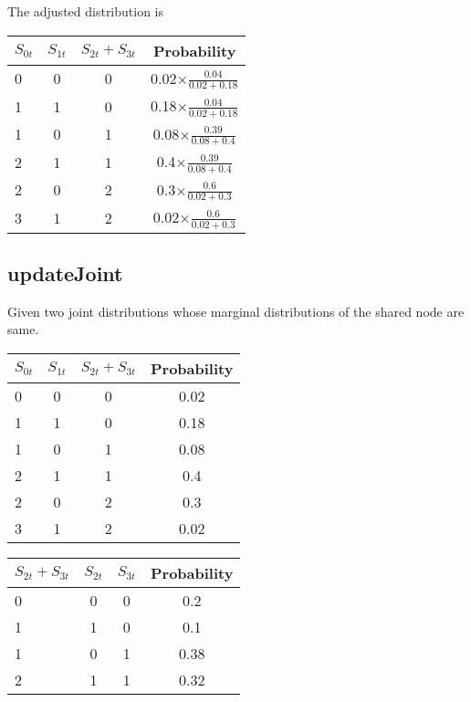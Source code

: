 \documentclass[12pt]{article}
\begin{document}
\noindent The adjusted distribution is

\begin{table}[h]
    \begin{tabular}{lccc}
        \hline
        $S_{0t}$ & $S_{1t}$ & $S_{2t}+S_{3t}$ & Probability\\\hline
        0 & 0 & 0 &  0.02$\times\frac{0.04}{0.02+0.18}$\\
        1 & 1 & 0 &  0.18$\times\frac{0.04}{0.02+0.18}$ \\
        1 & 0 & 1 &  0.08$\times\frac{0.39}{0.08+0.4}$ \\
        2 & 1 & 1 &  0.4$\times\frac{0.39}{0.08+0.4}$\\
        2 & 0 & 2 &  0.3$\times\frac{0.6}{0.02+0.3}$\\
        3 & 1 & 2 &  0.02$\times\frac{0.6}{0.02+0.3}$\\\hline
    \end{tabular}
\end{table}


\subsection{updateJoint}
\label{updateJoint}

Given two joint distributions whose marginal distributions of the shared node are same.

\vspace{4mm}

\begin{minipage}[t]{0.4\textwidth}
    \begin{tabular}{lccc}
        \hline
        $S_{0t}$ & $S_{1t}$ & $S_{2t}+S_{3t}$ & Probability\\\hline
        0 & 0 & 0 &  0.02\\
        1 & 1 & 0 &  0.18 \\
        1 & 0 & 1 &  0.08 \\
        2 & 1 & 1 &  0.4\\
        2 & 0 & 2 &  0.3\\
        3 & 1 & 2 &  0.02\\\hline
    \end{tabular}
\end{minipage}%
\begin{minipage}[t]{.4\textwidth}
    \begin{tabular}{lccc}
        \hline
        $S_{2t}+S_{3t}$ & $S_{2t}$ & $S_{3t}$ &  Probability\\\hline
        0 & 0 & 0 &  0.2\\
        1 & 1 & 0 &  0.1 \\
        1 & 0 & 1 &  0.38 \\
        2 & 1 & 1 &  0.32\\\hline
    \end{tabular}
\end{minipage}%
\end{document}
